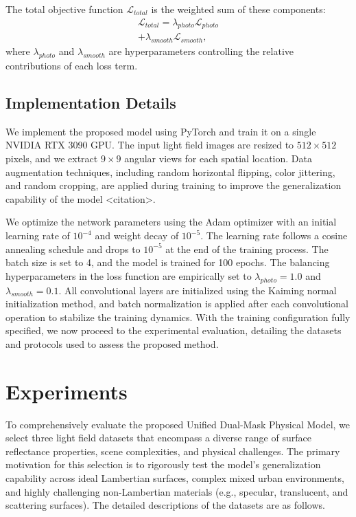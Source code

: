 \documentclass[lettersize,journal]{IEEEtran}
\begin{document}
The total objective function $\mathcal{L}_{total}$ is the weighted sum of these components:
\begin{multline}

\mathcal{L}_{total} = \lambda_{photo} \mathcal{L}_{photo} \\
+ \lambda_{smooth} \mathcal{L}_{smooth},
\end{multline}
where $\lambda_{photo}$ and $\lambda_{smooth}$ are hyperparameters controlling the relative contributions of each loss term.

\subsection{Implementation Details}
We implement the proposed model using PyTorch and train it on a single NVIDIA RTX 3090 GPU. The input light field images are resized to $512 \times 512$ pixels, and we extract $9 \times 9$ angular views for each spatial location. Data augmentation techniques, including random horizontal flipping, color jittering, and random cropping, are applied during training to improve the generalization capability of the model <citation>. 

We optimize the network parameters using the Adam optimizer with an initial learning rate of $10^{-4}$ and weight decay of $10^{-5}$. The learning rate follows a cosine annealing schedule and drops to $10^{-5}$ at the end of the training process. The batch size is set to 4, and the model is trained for 100 epochs. The balancing hyperparameters in the loss function are empirically set to $\lambda_{photo} = 1.0$ and $\lambda_{smooth} = 0.1$. All convolutional layers are initialized using the Kaiming normal initialization method, and batch normalization is applied after each convolutional operation to stabilize the training dynamics. With the training configuration fully specified, we now proceed to the experimental evaluation, detailing the datasets and protocols used to assess the proposed method.

\section{Experiments}

To comprehensively evaluate the proposed Unified Dual-Mask Physical Model, we select three light field datasets that encompass a diverse range of surface reflectance properties, scene complexities, and physical challenges. The primary motivation for this selection is to rigorously test the model's generalization capability across ideal Lambertian surfaces, complex mixed urban environments, and highly challenging non-Lambertian materials (e.g., specular, translucent, and scattering surfaces). The detailed descriptions of the datasets are as follows.
\end{document}
